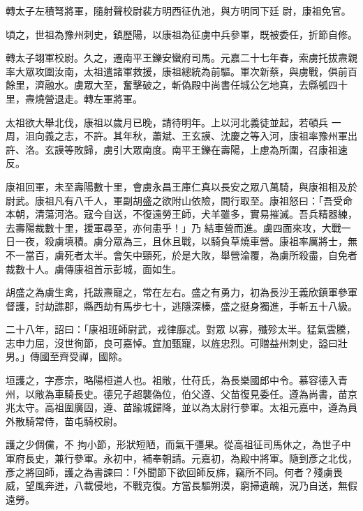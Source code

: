 \begin{pinyinscope}
 轉太子左積弩將軍，隨射聲校尉裴方明西征仇池，與方明同下廷
 尉，康祖免官。



 頃之，世祖為豫州刺史，鎮歷陽，以康祖為征虜中兵參軍，既被委任，折節自修。



 轉太子翊軍校尉。久之，遷南平王鑠安蠻府司馬。元嘉二十七年春，索虜托拔燾親率大眾攻圍汝南，太祖遣諸軍救援，康祖總統為前驅。軍次新蔡，與虜戰，俱前百餘里，濟融水。虜眾大至，奮擊破之，斬偽殿中尚書任城公乞地真，去縣瓠四十里，燾燒營退走。轉左軍將軍。



 太祖欲大舉北伐，康祖以歲月已晚，請待明年。上以河北義徒並起，若頓兵
 一周，沮向義之志，不許。其年秋，蕭斌、王玄謨、沈慶之等入河，康祖率豫州軍出許、洛。玄謨等敗歸，虜引大眾南度。南平王鑠在壽陽，上慮為所圍，召康祖速反。



 康祖回軍，未至壽陽數十里，會虜永昌王庫仁真以長安之眾八萬騎，與康祖相及於尉武。康祖凡有八千人，軍副胡盛之欲附山依險，間行取至。康祖怒曰：「吾受命本朝，清蕩河洛。寇今自送，不復遠勞王師，犬羊雖多，實易摧滅。吾兵精器練，去壽陽裁數十里，援軍尋至，亦何患乎！」乃
 結車營而進。虜四面來攻，大戰一日一夜，殺虜填積。虜分眾為三，且休且戰，以騎負草燒車營。康祖率厲將士，無不一當百，虜死者太半。會矢中頸死，於是大敗，舉營淪覆，為虜所殺盡，自免者裁數十人。虜傳康祖首示彭城，面如生。



 胡盛之為虜生禽，托跋燾寵之，常在左右。盛之有勇力，初為長沙王義欣鎮軍參軍督護，討劫譙郡，縣西劫有馬步七十，逃隱深榛，盛之挺身獨進，手斬五十八級。



 二十八年，詔曰：「康祖班師尉武，戎律靡忒。對眾
 以寡，殲殄太半。猛氣雲騰，志申力屈，沒世徇節，良可嘉悼。宜加甄寵，以旌忠烈。可贈益州刺史，謚曰壯男。」傳國至齊受禪，國除。



 垣護之，字彥宗，略陽桓道人也。祖敞，仕苻氏，為長樂國郎中令。慕容德入青州，以敞為車騎長史。德兄子超襲偽位，伯父遵、父苗復見委任。遵為尚書，苗京兆太守。高祖圍廣固，遵、苗踰城歸降，並以為太尉行參軍。太祖元嘉中，遵為員外散騎常侍，苗屯騎校尉。



 護之少倜儻，不
 拘小節，形狀短陋，而氣干彊果。從高祖征司馬休之，為世子中軍府長史，兼行參軍。永初中，補奉朝請。元嘉初，為殿中將軍。隨到彥之北伐，彥之將回師，護之為書諫曰：「外聞節下欲回師反旆，竊所不同。何者？殘虜畏威，望風奔迸，八載侵地，不戰克復。方當長驅朔漠，窮掃遺醜，況乃自送，無假遠勞。




\end{pinyinscope}

